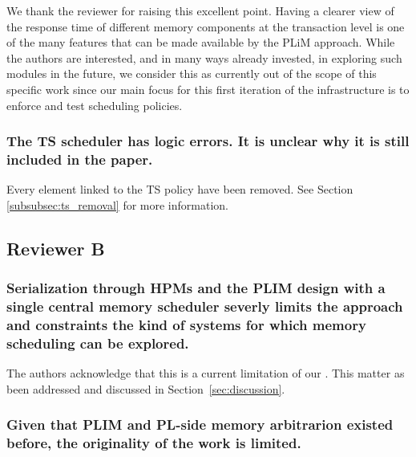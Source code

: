             We thank the reviewer for raising this excellent
            point. Having a clearer view of the response time of
            different memory components at the transaction level is
            one of the many features that can be made available by the
            PLiM approach. While the authors are interested, and in
            many ways already invested, in exploring such modules in
            the future, we consider this as currently out of the scope
            of this specific work since our main focus for this first
            iteration of the \schim infrastructure is to enforce and
            test scheduling policies.

        \subsubsection{The TS scheduler has logic errors. It is
        unclear why it is still included in the paper.}

            Every element linked to the TS policy have been
            removed. See Section \ref{subsubsec:ts_removal} for more
            information.

    \subsection{Reviewer B}

        \subsubsection{Serialization through HPMs and the PLIM design with
        a single central memory scheduler severly limits the approach
        and constraints the kind of systems for which memory
        scheduling can be explored.}

        The authors acknowledge that this is a current limitation of
        our \schim. This matter as been addressed and discussed in
        Section~\ref{sec:discussion}.

        \subsubsection{Given that PLIM and PL-side memory arbitrarion
        existed before, the originality of the work is limited.}

